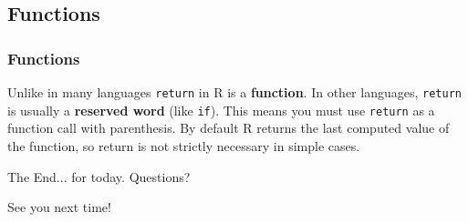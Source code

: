 \documentclass{beamer}
\begin{document}
\subsection{Functions}


\begin{frame}
	\frametitle{Functions}
	\lstV
	Unlike in many languages \texttt{return} in R is a \textbf{function}.
	In other languages, \texttt{return} is usually a \textbf{reserved word} 
	(like \texttt{if}). This means you must use \texttt{return} as a function 
	call with parenthesis. By default R returns the last computed value of the 
	function, so return is not strictly necessary in simple cases.
\end{frame}


\begin{frame}
\Huge{\centerline{The End... for today. Questions?}}
See you next time!
\end{frame}

\end{document}
